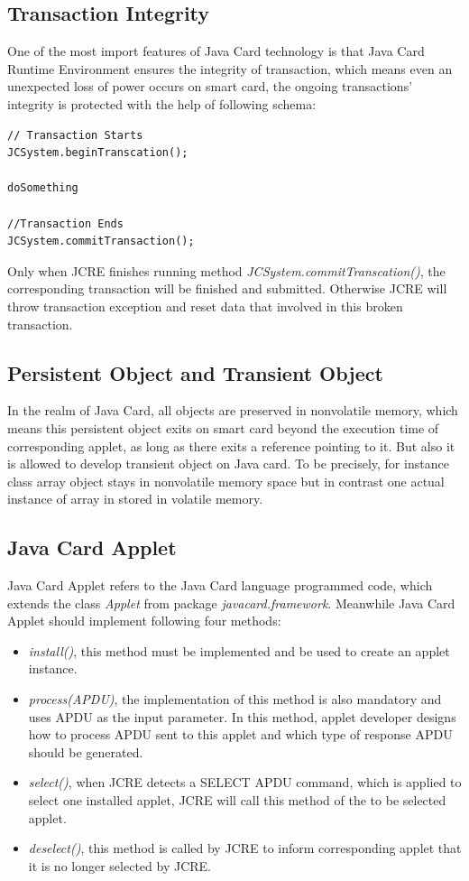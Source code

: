\subsection{Transaction Integrity}
One of the most import features of Java Card technology is that Java Card Runtime Environment ensures the integrity of transaction, which means even an unexpected loss of power occurs on smart card, the ongoing transactions' integrity is protected with the help of following schema\cite{handbuch}:
\begin{verbatim}
// Transaction Starts
JCSystem.beginTranscation();

doSomething

//Transaction Ends
JCSystem.commitTransaction();
\end{verbatim}
Only when JCRE finishes running method \emph{JCSystem.commitTranscation()}, the corresponding transaction will be finished and submitted. Otherwise JCRE will throw transaction exception and reset data that involved in this broken transaction.

\subsection{Persistent Object and Transient Object}
In  the realm of Java Card, all objects are preserved in nonvolatile memory, which means this persistent object exits on smart card beyond the execution time of corresponding applet, as long as there exits a reference pointing to it. But also it is allowed to develop transient object on Java card. To be precisely, for instance class array object stays in nonvolatile memory space but in contrast one actual instance of array in stored in volatile memory\cite{handbuch}.

\subsection{Java Card Applet}
Java Card Applet refers to the Java Card language programmed code, which extends the class \emph{Applet} from package \emph{javacard.framework}. Meanwhile Java Card Applet should implement following four methods:
\begin{itemize}
\item\emph{install()}, this method must be implemented and be used to create an applet instance.
\item\emph{process(APDU)}, the implementation of this method is also mandatory and uses APDU as the input parameter. In this method, applet developer designs how to process APDU sent to this applet and which type of response APDU should be generated.
\item \emph{select()}, when JCRE detects a SELECT APDU command, which is applied to select one installed applet, JCRE will call this method of the to be selected applet.
\item  \emph{deselect()}, this method is called by JCRE to inform corresponding applet that it is no longer selected by JCRE.
\end{itemize}

